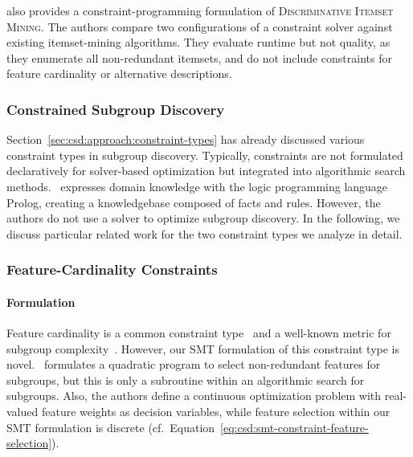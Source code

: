 \documentclass{article}
\theoremstyle{definition}
\begin{document}
\cite{guns2011itemset} also provides a constraint-programming formulation of \textsc{Discriminative Itemset Mining}.
The authors compare two configurations of a constraint solver against existing itemset-mining algorithms.
They evaluate runtime but not quality, as they enumerate all non-redundant itemsets, and do not include constraints for feature cardinality or alternative descriptions.

\subsubsection{Constrained Subgroup Discovery}
\label{sec:csd:related-work:subgroup-discovery:constraints}

Section~\ref{sec:csd:approach:constraint-types} has already discussed various constraint types in subgroup discovery.
Typically, constraints are not formulated declaratively for solver-based optimization but integrated into algorithmic search methods.
\cite{atzmueller2007using}~expresses domain knowledge with the logic programming language Prolog, creating a knowledgebase composed of facts and rules.
However, the authors do not use a solver to optimize subgroup discovery.
In the following, we discuss particular related work for the two constraint types we analyze in detail.

\subsubsection{Feature-Cardinality Constraints}
\label{sec:csd:related-work:subgroup-discovery:cardinality}

\paragraph{Formulation}

Feature cardinality is a common constraint type~\cite{meeng2021real} and a well-known metric for subgroup complexity~\cite{ helal2016subgroup, herrera2011overview, ventura2018subgroup}.
However, our SMT formulation of this constraint type is novel.
\cite{li2015efficient}~formulates a quadratic program to select non-redundant features for subgroups, but this is only a subroutine within an algorithmic search for subgroups.
Also, the authors define a continuous optimization problem with real-valued feature weights as decision variables, while feature selection within our SMT formulation is discrete (cf.~Equation~\ref{eq:csd:smt-constraint-feature-selection}).
\end{document}
